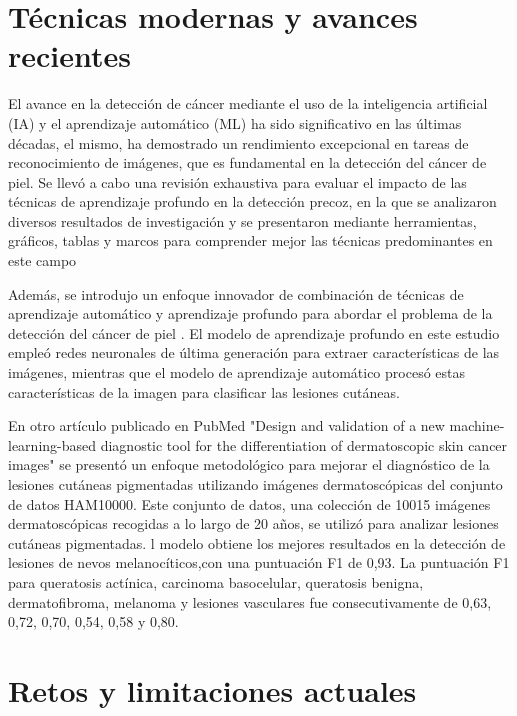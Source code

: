 \section{Técnicas modernas y avances recientes}

El avance en la detección de cáncer mediante el uso de la inteligencia artificial (IA) y el aprendizaje automático (ML) ha sido significativo en 
las últimas décadas, el mismo, ha demostrado un rendimiento excepcional en tareas de reconocimiento de imágenes, que es fundamental en la detección 
del cáncer de piel. Se llevó a cabo una revisión exhaustiva para evaluar el impacto de las técnicas de aprendizaje profundo en la detección precoz, 
en la que se analizaron diversos resultados de investigación y se presentaron mediante herramientas, gráficos, tablas y marcos para comprender mejor 
las técnicas predominantes en este campo 


Además, se introdujo un enfoque innovador de combinación de técnicas de aprendizaje automático y aprendizaje profundo para abordar el 
problema de la detección del cáncer de piel .
 El modelo de aprendizaje profundo en este estudio empleó redes neuronales de última generación para extraer características de las imágenes, mientras que el modelo de aprendizaje automático procesó estas características de la imagen para clasificar las lesiones cutáneas.


En otro artículo publicado en PubMed "Design and validation of a new machine-learning-based diagnostic tool for the differentiation of dermatoscopic skin cancer images" 
 se presentó un enfoque metodológico para mejorar el diagnóstico de la lesiones cutáneas pigmentadas utilizando imágenes dermatoscópicas del conjunto de datos HAM10000. Este conjunto de datos, una colección de 10015 imágenes dermatoscópicas recogidas a lo largo de 20 años, se utilizó para analizar lesiones cutáneas pigmentadas. l modelo obtiene los mejores resultados en la detección de lesiones de nevos melanocíticos,con una puntuación F1 de 0,93. La puntuación F1 para queratosis actínica, carcinoma basocelular, queratosis benigna, dermatofibroma, melanoma y lesiones vasculares fue consecutivamente de 0,63, 0,72, 0,70, 0,54, 0,58 y 0,80.


\section{Retos y limitaciones actuales}

